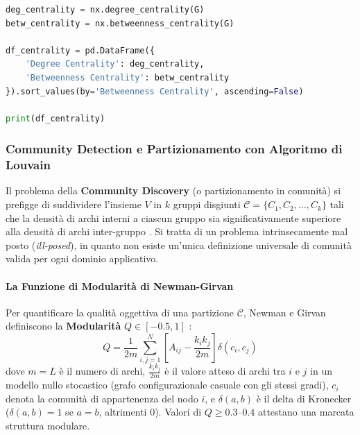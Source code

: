 \begin{lstlisting}[language=Python, caption={Calcolo comparativo di Degree Centrality e Betweenness Centrality.}]
deg_centrality = nx.degree_centrality(G)
betw_centrality = nx.betweenness_centrality(G)

df_centrality = pd.DataFrame({
    'Degree Centrality': deg_centrality,
    'Betweenness Centrality': betw_centrality
}).sort_values(by='Betweenness Centrality', ascending=False)

print(df_centrality)
\end{lstlisting}

\FloatBarrier
\subsubsection{Community Detection e Partizionamento con Algoritmo di Louvain}
\label{subsec:lab-community-louvain}

Il problema della \textbf{Community Discovery} (o partizionamento in comunità) si prefigge di suddividere l'insieme $V$ in $k$ gruppi disgiunti $\mathcal{C} = \{C_1, C_2, \dots, C_k\}$ tali che la densità di archi interni a ciascun gruppo sia significativamente superiore alla densità di archi inter-gruppo \cite{fortunato2010}. Si tratta di un problema intrinsecamente mal posto (\textit{ill-posed}), in quanto non esiste un'unica definizione universale di comunità valida per ogni dominio applicativo.

\paragraph{La Funzione di Modularità di Newman-Girvan}
Per quantificare la qualità oggettiva di una partizione $\mathcal{C}$, Newman e Girvan definiscono la \textbf{Modularità} $Q \in [-0.5, 1]$ \cite{fortunato2010}:
\begin{equation}
    Q = \frac{1}{2m} \sum_{i,j=1}^N \left[ A_{ij} - \frac{k_i k_j}{2m} \right] \delta(c_i, c_j)
\end{equation}
dove $m = L$ è il numero di archi, $\frac{k_i k_j}{2m}$ è il valore atteso di archi tra $i$ e $j$ in un modello nullo stocastico (grafo configurazionale casuale con gli stessi gradi), $c_i$ denota la comunità di appartenenza del nodo $i$, e $\delta(a, b)$ è il delta di Kronecker ($\delta(a,b)=1$ se $a=b$, altrimenti $0$). Valori di $Q \ge 0.3$--$0.4$ attestano una marcata struttura modulare.

